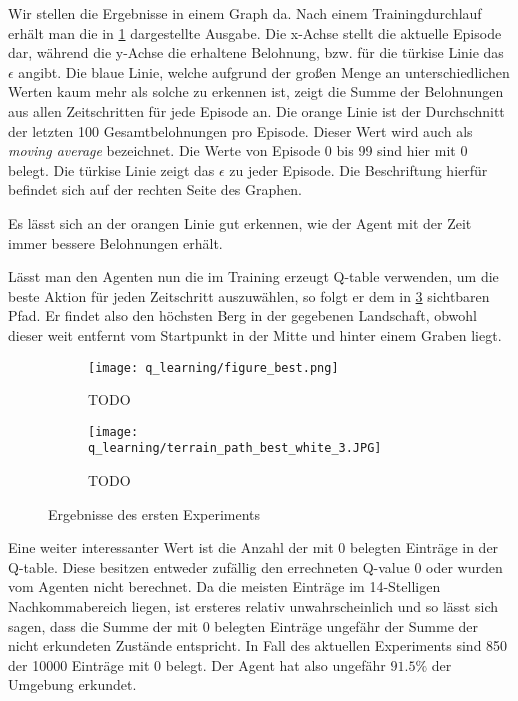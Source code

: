 Wir stellen die Ergebnisse in einem Graph da. Nach einem Trainingdurchlauf erhält man die in \ref{img:graphQBest} dargestellte Ausgabe. Die x-Achse stellt die aktuelle Episode dar, während die y-Achse die erhaltene Belohnung, bzw. für die türkise Linie das $ \epsilon $ angibt. Die blaue Linie, welche aufgrund der großen Menge an unterschiedlichen Werten kaum mehr als solche zu erkennen ist, zeigt die Summe der Belohnungen aus allen Zeitschritten für jede Episode an. Die orange Linie ist der Durchschnitt der letzten 100 Gesamtbelohnungen pro Episode. Dieser Wert wird auch als \textit{moving average} bezeichnet. Die Werte von Episode 0 bis 99 sind hier mit 0 belegt. Die türkise Linie zeigt das $ \epsilon $ zu jeder Episode. Die Beschriftung hierfür befindet sich auf der rechten Seite des Graphen.

Es lässt sich an der orangen Linie gut erkennen, wie der Agent mit der Zeit immer bessere Belohnungen erhält.

Lässt man den Agenten nun die im Training erzeugt Q-table verwenden, um die beste Aktion für jeden Zeitschritt auszuwählen, so folgt er dem in \ref{img:pathQBest} sichtbaren Pfad. Er findet also den höchsten Berg in der gegebenen Landschaft, obwohl dieser weit entfernt vom Startpunkt in der Mitte und hinter einem Graben liegt.

\begin{figure}[H]
    \centering
    \begin{subfigure}[b]{0.49\textwidth}
        \texttt{[image: q\_learning/figure\_best.png]}
        \caption{TODO}
        \label{img:graphQBest}
    \end{subfigure}
    \begin{subfigure}[b]{0.49\textwidth}
        \texttt{[image: q\_learning/terrain\_path\_best\_white\_3.JPG]}
        \caption{TODO}
        \label{img:pathQBest}
    \end{subfigure}
    \caption{Ergebnisse des ersten Experiments}
\end{figure}

Eine weiter interessanter Wert ist die Anzahl der mit 0 belegten Einträge in der Q-table. Diese besitzen entweder zufällig den errechneten Q-value 0 oder wurden vom Agenten nicht berechnet. Da die meisten Einträge im 14-Stelligen Nachkommabereich liegen, ist ersteres relativ unwahrscheinlich und so lässt sich sagen, dass die Summe der mit 0 belegten Einträge ungefähr der Summe der nicht erkundeten Zustände entspricht. In Fall des aktuellen Experiments sind 850 der 10000 Einträge mit 0 belegt. Der Agent hat also ungefähr $ 91.5\% $ der Umgebung erkundet.

